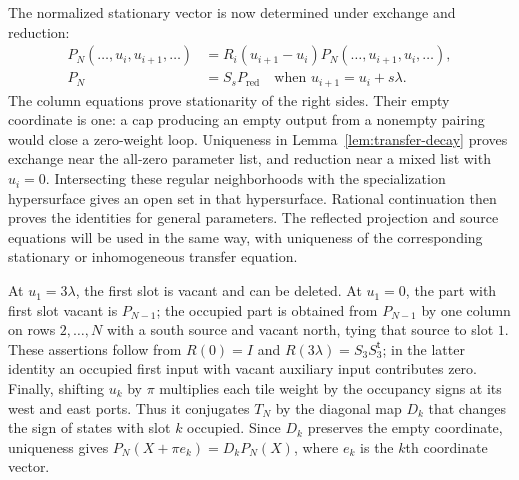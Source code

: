 The normalized stationary vector is now determined under exchange
and reduction:
\begin{align}
 P_N(\ldots,u_i,u_{i+1},\ldots)
 &=R_i(u_{i+1}-u_i)P_N(\ldots,u_{i+1},u_i,\ldots),
 \label{eq:01-vacuum-exchange}\\
 P_N&=S_sP_{\mathrm{red}}
 \quad\text{when }u_{i+1}=u_i+s\lambda.
 \label{eq:01-vacuum-reduction}
\end{align}
The column equations prove stationarity of the right sides. Their empty
coordinate is one: a cap producing an empty output from a nonempty
pairing would close a zero-weight loop. Uniqueness in
Lemma~\ref{lem:transfer-decay} proves exchange near the all-zero
parameter list, and reduction near a mixed list with $u_i=0$.
Intersecting these regular neighborhoods with the specialization
hypersurface gives an open set in that hypersurface. Rational
continuation then proves the identities for general parameters.
The reflected projection and source equations will be used in the
same way, with uniqueness of the corresponding stationary or
inhomogeneous transfer equation.

At $u_1=3\lambda$, the first slot is vacant and can be deleted. At
$u_1=0$, the part with first slot vacant is $P_{N-1}$; the occupied
part is obtained from $P_{N-1}$ by one column on rows $2,\ldots,N$
with a south source and vacant north, tying that source to slot $1$.
These assertions follow from $R(0)=I$ and
$R(3\lambda)=S_3S_3^{\mathsf t}$; in the latter identity an occupied
first input with vacant auxiliary input contributes zero.
Finally, shifting $u_k$ by $\pi$ multiplies each tile weight by the
occupancy signs at its west and east ports. Thus it conjugates $T_N$
by the diagonal map $D_k$ that changes the sign of states with slot
$k$ occupied. Since $D_k$ preserves the empty coordinate, uniqueness
gives $P_N(X+\pi e_k)=D_kP_N(X)$, where $e_k$ is the $k$th coordinate
vector.
